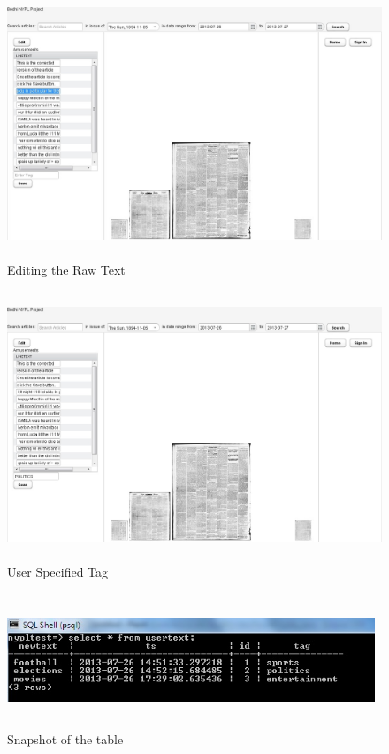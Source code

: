 \documentclass[12pt]{article}
\begin{document}
\begin{figure}[H]
\centering
\includegraphics[width=14cm,height=8cm]{editing.jpg}
\caption{Editing the Raw Text}
\label{fig:9}
\end{figure}

\begin{figure}[H]
\centering
\includegraphics[width=14cm,height=8cm]{tag.jpg}
\caption{User Specified Tag}
\label{fig:10}
\end{figure}

\begin{figure}[H]
\centering
\includegraphics[width=11cm,height=4cm]{db.jpg}
\caption{Snapshot of the table}
\label{fig:11}
\end{figure}
\end{document}
